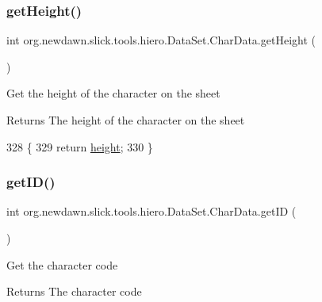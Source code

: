 \subsubsection{\texorpdfstring{get\+Height()}{getHeight()}}
{\footnotesize\ttfamily int org.\+newdawn.\+slick.\+tools.\+hiero.\+Data\+Set.\+Char\+Data.\+get\+Height (\begin{DoxyParamCaption}{ }\end{DoxyParamCaption})\hspace{0.3cm}{\ttfamily [inline]}}

Get the height of the character on the sheet

\begin{DoxyReturn}{Returns}
The height of the character on the sheet 
\end{DoxyReturn}

\begin{DoxyCode}
328                                \{
329             \textcolor{keywordflow}{return} \mbox{\hyperlink{classorg_1_1newdawn_1_1slick_1_1tools_1_1hiero_1_1_data_set_1_1_char_data_ad9c673d8f3b449d6a57ea4af78846d62}{height}};
330         \}
\end{DoxyCode}
\mbox{\label{classorg_1_1newdawn_1_1slick_1_1tools_1_1hiero_1_1_data_set_1_1_char_data_ac38124403806c9ee42a09417bc0fec75}} 
\subsubsection{\texorpdfstring{get\+I\+D()}{getID()}}
{\footnotesize\ttfamily int org.\+newdawn.\+slick.\+tools.\+hiero.\+Data\+Set.\+Char\+Data.\+get\+ID (\begin{DoxyParamCaption}{ }\end{DoxyParamCaption})\hspace{0.3cm}{\ttfamily [inline]}}

Get the character code

\begin{DoxyReturn}{Returns}
The character code 
\end{DoxyReturn}

